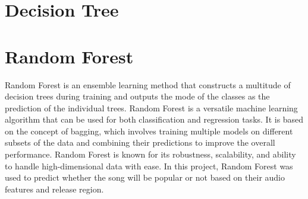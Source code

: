 \begin{itemize}
\end{itemize} 







\section{Decision Tree}




\section{Random Forest}
Random Forest is an ensemble learning method that constructs a multitude of decision trees during
training and outputs the mode of the classes as the prediction of the individual trees. Random Forest
is a versatile machine learning algorithm that can be used for both classification and regression
tasks. It is based on the concept of bagging, which involves training multiple models on different
subsets of the data and combining their predictions to improve the overall performance. Random Forest
is known for its robustness, scalability, and ability to handle high-dimensional data with ease.
In this project, Random Forest was used to predict whether the song will be popular or not based on their audio
features and release region. \\




